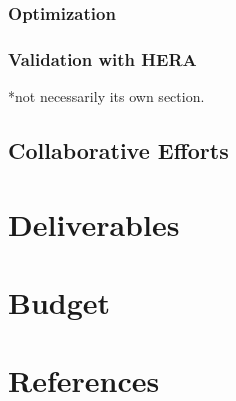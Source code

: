 \documentclass[]{article}
\begin{document}
\subsubsection{Optimization}
%
\subsubsection{Validation with HERA}
*not necessarily its own section.
\subsection{Collaborative Efforts}

\section{Deliverables}

\section{Budget}
\section{References}



\cite{Abeyratne:2012ah}
\cite{Abeyratne:2015pma}
\cite{Kondratenko:2016eqn}
\cite{Lin}
\cite{Morozov:2012}
\cite{Morozov:2014}
\cite{Nosochkov:2015}
\end{document}
